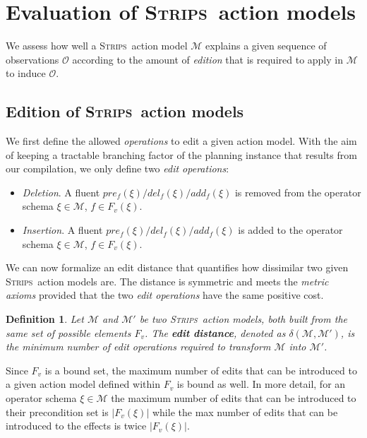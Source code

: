 \documentclass{article}
\newcommand{\strips}{\textsc{Strips}}     %
\newtheorem{definition}[theorem]{Definition}
\begin{document}
\section{Evaluation of \strips\ action models}
\label{model_evaluation}

We assess how well a \strips\ action model $\mathcal{M}$ explains a given sequence of observations $\mathcal{O}$ according to the amount of {\em edition} that is required to apply in $\mathcal{M}$ to induce $\mathcal{O}$. %

\subsection{Edition of \strips\ action models}

We first define the allowed \emph{operations} to edit a given action model. With the aim of keeping a tractable branching factor of the planning instance that results from our compilation, we only define two {\em edit operations}:
\begin{itemize}
\item {\em Deletion}. A fluent $pre_f(\xi)/del_f(\xi)/add_f(\xi)$ is removed from the operator schema $\xi\in\mathcal{M}$, $f\in F_v(\xi)$.
\item {\em Insertion}. A fluent $pre_f(\xi)/del_f(\xi)/add_f(\xi)$ is added to the operator schema $\xi\in\mathcal{M}$, $f\in F_v(\xi)$.
\end{itemize}

We can now formalize an edit distance that quantifies how dissimilar two given \strips\ action models are. The distance is symmetric and meets the {\em metric axioms} provided that the two {\em edit operations} have the same positive cost.

\begin{definition}
Let $\mathcal{M}$ and $\mathcal{M}'$ be two \strips\ action models, both built from the same set of possible elements $F_v$. The {\bf edit distance}, denoted as $\delta(\mathcal{M},\mathcal{M}')$, is the minimum number of {\em edit operations} required to transform $\mathcal{M}$ into $\mathcal{M}'$.
\end{definition}

Since $F_v$ is a bound set, the maximum number of edits that can be introduced to a given action model defined within $F_v$ is bound as well. In more detail, for an operator schema $\xi\in\mathcal{M}$ the maximum number of edits that can be introduced to their precondition set is $|F_v(\xi)|$ while the max number of edits that can be introduced to the effects is twice $|F_v(\xi)|$.
\end{document}
